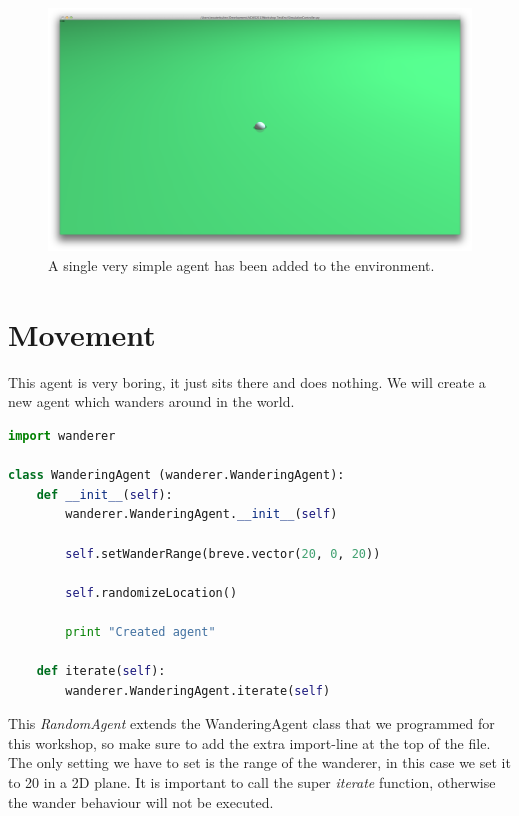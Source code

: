 \begin{figure}[htbp]
\begin{center}
\includegraphics{graphics/simpleagent}
\caption{A single very simple agent has been added to the environment.}
\end{center}
\end{figure}

\section{Movement}
This agent is very boring, it just sits there and does nothing. We will create a new agent which wanders around in the world.

\begin{fullwidth}
\begin{lstlisting}[language=Python]
import wanderer

class WanderingAgent (wanderer.WanderingAgent):
	def __init__(self):
		wanderer.WanderingAgent.__init__(self)

		self.setWanderRange(breve.vector(20, 0, 20))
		
		self.randomizeLocation()
		
		print "Created agent"

	def iterate(self):
		wanderer.WanderingAgent.iterate(self)
\end{lstlisting}
\end{fullwidth}


This \textit{RandomAgent} extends the WanderingAgent class that we programmed for this workshop, so make sure to add the extra import-line at the top of the file. The only setting we have to set is the range of the wanderer, in this case we set it to 20 in a 2D plane. It is important to call the super \textit{iterate} function, otherwise the wander behaviour will not be executed.

